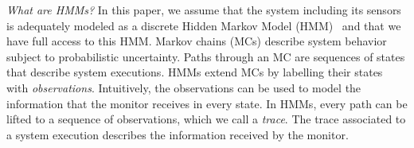 \documentclass[runningheads]{llncs}
\renewcommand{\paragraph}[1]{\smallskip\noindent\emph{#1}}
\begin{document}
\paragraph{What are HMMs?}
In this paper, we assume that the system including its sensors is adequately modeled as a discrete Hidden Markov Model (HMM)~\cite{rabinerTutorialHiddenMarkov1989} and that we have full access to this HMM.
Markov chains (MCs) describe system behavior subject to probabilistic uncertainty.
Paths through an MC are sequences of states that describe system executions.
HMMs extend MCs by labelling their states with \emph{observations}.
Intuitively, the observations can be used to model the information that the monitor receives in every state.
In HMMs, every path can be lifted to a sequence of observations, which we call a \emph{trace}.
The trace associated to a system execution describes the information received by the monitor.
\end{document}
